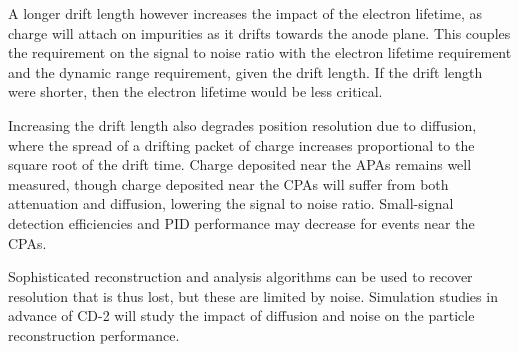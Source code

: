 A longer drift length however increases the impact of the electron
lifetime, as charge will attach on impurities as it drifts towards the
anode plane.  This couples the requirement on the signal to noise
ratio with the electron lifetime requirement and the dynamic range
requirement, given the drift length.  If the drift length were
shorter, then the electron lifetime would be less critical.

Increasing the drift length also degrades position resolution due to
diffusion, where the spread of a drifting packet of charge increases
proportional to the square root of the drift time.  Charge deposited
near the APAs remains well measured, though charge deposited near the
CPAs will suffer from both attenuation and diffusion, lowering the
signal to noise ratio.  Small-signal detection efficiencies and PID
performance may decrease for events near the CPAs.

Sophisticated reconstruction and analysis algorithms can be used to
recover resolution that is thus lost, but these are limited by noise.
Simulation studies in advance of CD-2 will study the impact of
diffusion and noise on the particle reconstruction performance.
